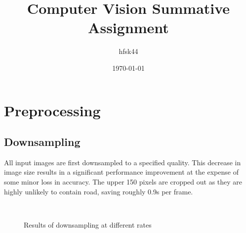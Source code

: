 \documentclass[10pt]{article}
\title{Computer Vision Summative Assignment}
\author{hfsk44}
\date{\today}
\begin{document}
 
\maketitle

\section *{Preprocessing}

\subsection *{Downsampling}
    All input images are first downsampled to a specified quality. This decrease in image size results in a significant performance improvement at the expense of some minor loss in accuracy. The upper 150 pixels are cropped out as they are highly unlikely to contain road, saving roughly 0.9s per frame.

    \begin{figure}[!h]
        \centering
        \hfill
        \\
        \hfill
        \caption{Results of downsampling at different rates}
    \end{figure}
\end{document}
